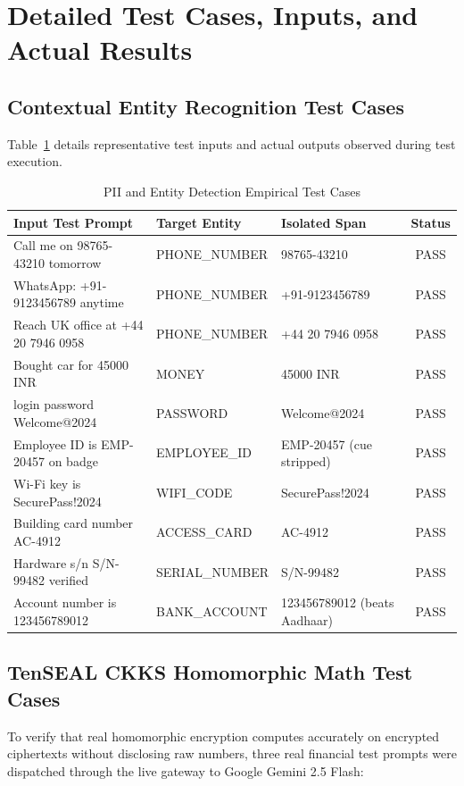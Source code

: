 \section{Detailed Test Cases, Inputs, and Actual Results}

\subsection{Contextual Entity Recognition Test Cases}
Table~\ref{tab:pii_test_cases} details representative test inputs and actual outputs observed during test execution.

\begin{table}[htbp]
\centering
\caption{PII and Entity Detection Empirical Test Cases}\label{tab:pii_test_cases}
\begin{tabular}{p{}p{}p{}c}
\toprule
\textbf{Input Test Prompt} & \textbf{Target Entity} & \textbf{Isolated Span} & \textbf{Status} \\
\midrule
Call me on 98765-43210 tomorrow & PHONE\_NUMBER & 98765-43210 & PASS \\
WhatsApp: +91-9123456789 anytime & PHONE\_NUMBER & +91-9123456789 & PASS \\
Reach UK office at +44 20 7946 0958 & PHONE\_NUMBER & +44 20 7946 0958 & PASS \\
Bought car for 45000 INR & MONEY & 45000 INR & PASS \\
login password Welcome@2024 & PASSWORD & Welcome@2024 & PASS \\
Employee ID is EMP-20457 on badge & EMPLOYEE\_ID & EMP-20457 (cue stripped) & PASS \\
Wi-Fi key is SecurePass!2024 & WIFI\_CODE & SecurePass!2024 & PASS \\
Building card number AC-4912 & ACCESS\_CARD & AC-4912 & PASS \\
Hardware s/n S/N-99482 verified & SERIAL\_NUMBER & S/N-99482 & PASS \\
Account number is 123456789012 & BANK\_ACCOUNT & 123456789012 (beats Aadhaar) & PASS \\
\bottomrule
\end{tabular}
\end{table}

\subsection{TenSEAL CKKS Homomorphic Math Test Cases}
To verify that real homomorphic encryption computes accurately on encrypted ciphertexts without disclosing raw numbers, three real financial test prompts were dispatched through the live gateway to Google Gemini 2.5 Flash:

